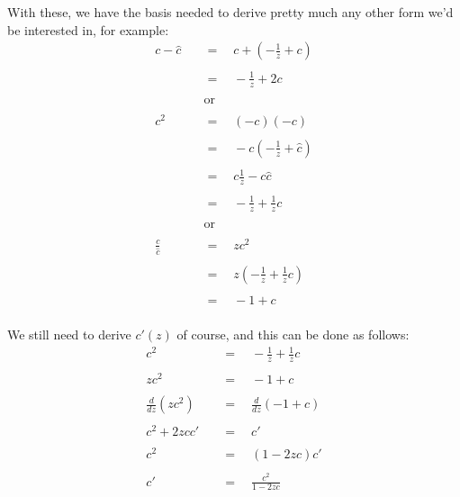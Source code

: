 \documentclass[twoside]{article}
\newcommand{\equals}{\ensuremath{\quad =\quad}}
\newcommand{\cat}{\ensuremath{c}}
\newcommand{\chat}{\ensuremath{\hat{c}}}
\begin{document}
With these, we have the basis needed to derive pretty much any other form we'd be interested in, for example:
\begin{align*}
\cat-\chat		& \equals \cat+\left(-\frac{1}{z}+\cat\right)			\\
											\\
			& \equals -\frac{1}{z}+2\cat					\\
											\\
			& \quad\mbox{or}						\\
											\\
\cat^2			& \equals (-\cat)(-\cat)					\\
											\\
			& \equals -\cat\left(-\frac{1}{z}+\chat\right)			\\
											\\
			& \equals \cat\frac{1}{z}-\cat\chat				\\
											\\
			& \equals -\frac{1}{z}+\frac{1}{z}\cat				\\
											\\
			& \quad\mbox{or}						\\
											\\
\frac{\cat}{\chat}	& \equals z\cat^2						\\
											\\
			& \equals z\left(-\frac{1}{z}+\frac{1}{z}\cat\right)		\\
											\\
			& \equals -1+\cat						\\
\end{align*}

We still need to derive $ \cat'(z) $ of course, and this can be done as follows:
\begin{align*}
\cat^2			& \equals -\frac{1}{z}+\frac{1}{z}\cat				\\
											\\
z\cat^2			& \equals -1+\cat						\\
											\\
\frac{d}{dz}(z\cat^2)	& \equals \frac{d}{dz}(-1+\cat)					\\
											\\
\cat^2+2z\cat\cat'	& \equals \cat'							\\
											\\
\cat^2			& \equals (1-2z\cat)\cat'					\\
											\\
\cat'			& \equals \frac{\cat^2}{1-2z\cat}				\\
\end{align*}
\end{document}
